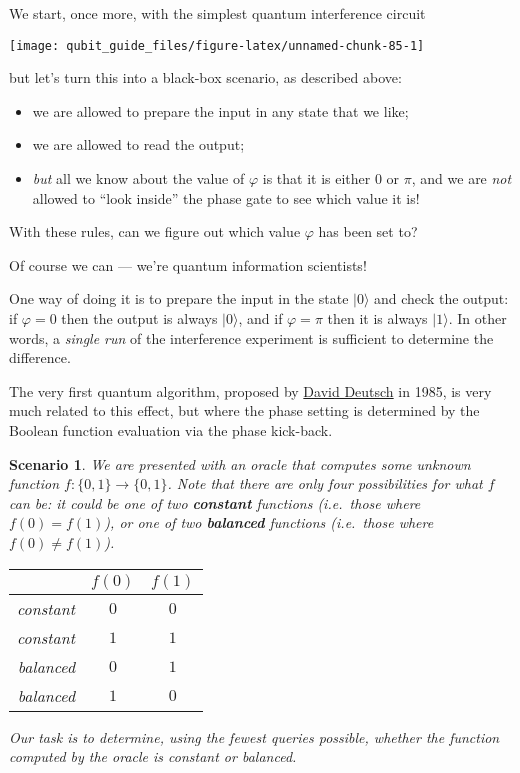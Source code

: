 \documentclass[fleqn]{article}
\providecommand{\tightlist}{%
  \setlength{\itemsep}{0pt}\setlength{\parskip}{0pt}}
\newtheorem*{scenario}{Scenario}
\begin{document}
We start, once more, with the simplest quantum interference circuit

\begin{center}\texttt{[image: qubit\_guide\_files/figure-latex/unnamed-chunk-85-1]} \end{center}

but let's turn this into a black-box scenario, as described above:

\begin{itemize}
\tightlist
\item
  we are allowed to prepare the input in any state that we like;
\item
  we are allowed to read the output;
\item
  \emph{but} all we know about the value of \(\varphi\) is that it is either \(0\) or \(\pi\), and we are \emph{not} allowed to ``look inside'' the phase gate to see which value it is!
\end{itemize}

With these rules, can we figure out which value \(\varphi\) has been set to?

Of course we can --- we're quantum information scientists!

One way of doing it is to prepare the input in the state \(|0\rangle\) and check the output: if \(\varphi=0\) then the output is always \(|0\rangle\), and if \(\varphi=\pi\) then it is always \(|1\rangle\).
In other words, a \emph{single run} of the interference experiment is sufficient to determine the difference.

The very first quantum algorithm, proposed by \href{https://en.wikipedia.org/wiki/David_Deutsch}{David Deutsch} in 1985, is very much related to this effect, but where the phase setting is determined by the Boolean function evaluation via the phase kick-back.

\begin{scenario}
We are presented with an oracle that computes some unknown function \(f\colon\{0,1\}\to\{0,1\}\).
Note that there are only four possibilities for what \(f\) can be: it could be one of two \textbf{constant} functions (i.e.~those where \(f(0)=f(1)\)), or one of two \textbf{balanced} functions (i.e.~those where \(f(0)\neq f(1)\)).

\begin{longtable}[]{@{}rcc@{}}
\toprule()
& \(f(0)\) & \(f(1)\) \\
\midrule()
\endhead
constant & \(0\) & \(0\) \\
constant & \(1\) & \(1\) \\
balanced & \(0\) & \(1\) \\
balanced & \(1\) & \(0\) \\
\bottomrule()
\end{longtable}

Our task is to determine, using the fewest queries possible, whether the function computed by the oracle is constant or balanced.

\end{scenario}
\end{document}
